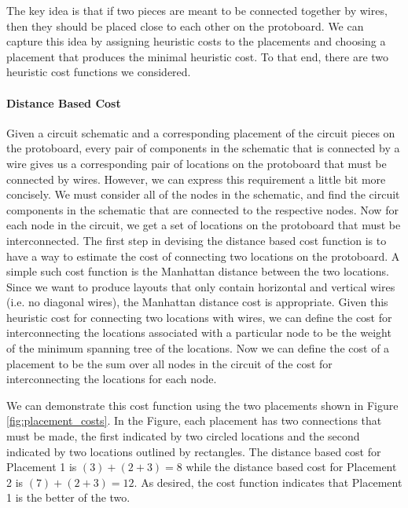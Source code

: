 The key idea is that if two pieces are meant to be connected together by wires,
then they should be placed close to each other on the protoboard. We can
capture this idea by assigning heuristic costs to the placements and choosing
a placement that produces the minimal heuristic cost. To that end, there are two
heuristic cost functions we considered.

\paragraph{Distance Based Cost}
Given a circuit
schematic and a corresponding placement of the circuit pieces on the protoboard,
every pair of components in the schematic that is connected by a wire gives us
a corresponding pair of
locations on the protoboard that must be connected by wires. However, we can
express this requirement a little bit more concisely. We must consider all
of the nodes in the schematic, and find the circuit components in the schematic
that are connected to the respective nodes. Now for each node in the circuit, we
get a set of locations on the protoboard that must be interconnected. The
first step in devising the distance based cost function is to have a way to
estimate the cost of connecting two locations on the protoboard. A simple such
cost function is the Manhattan distance between the two
locations. Since we want to produce layouts that only contain
horizontal and vertical wires (i.e. no diagonal wires), the Manhattan distance
cost is appropriate. Given this heuristic cost for connecting two locations with
wires, we can define the cost for interconnecting the locations
associated with a particular node to be the weight of the minimum spanning tree
of the locations. Now we can define the cost of a placement to be the sum over
all nodes in the circuit of the cost for interconnecting the locations for each
node.

We can demonstrate this cost function using the two placements shown in Figure
\ref{fig:placement_costs}. In the Figure, each placement has two connections
that must be made, the first indicated by two circled locations and the second
indicated by two locations outlined by rectangles. The distance based cost for
Placement 1 is $(3) + (2 + 3) = 8$ while the distance based cost for Placement 2
is $(7) + (2 + 3) = 12$. As desired, the cost function indicates that Placement 1
is the better of the two.

